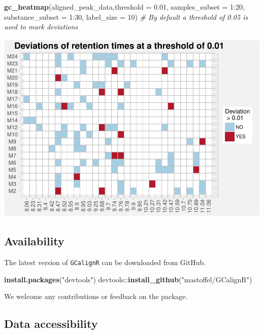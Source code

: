 \documentclass[]{article}
\newenvironment{Shaded}{}{}
\newcommand{\KeywordTok}[1]{\textbf{{#1}}}
\newcommand{\DataTypeTok}[1]{\textcolor[rgb]{0.50,0.00,0.00}{{#1}}}
\newcommand{\DecValTok}[1]{\textcolor[rgb]{0.00,0.00,1.00}{{#1}}}
\newcommand{\FloatTok}[1]{\textcolor[rgb]{0.50,0.00,0.50}{{#1}}}
\newcommand{\StringTok}[1]{\textcolor[rgb]{0.87,0.00,0.00}{{#1}}}
\newcommand{\CommentTok}[1]{\textcolor[rgb]{0.50,0.50,0.50}{\textit{{#1}}}}
\newcommand{\NormalTok}[1]{{#1}}
\begin{document}
\begin{Shaded}
\begin{Highlighting}[]
\KeywordTok{gc_heatmap}\NormalTok{(aligned_peak_data,}\DataTypeTok{threshold =} \FloatTok{0.01}\NormalTok{, }\DataTypeTok{samples_subset =} \DecValTok{1}\NormalTok{:}\DecValTok{20}\NormalTok{, }\DataTypeTok{substance_subset =} \DecValTok{1}\NormalTok{:}\DecValTok{30}\NormalTok{, }\DataTypeTok{label_size =} \DecValTok{10}\NormalTok{) }\CommentTok{# By default a threshold of 0.05 is used to mark deviations}
\end{Highlighting}
\end{Shaded}

\includegraphics{GCalignR_paper_files/figure-latex/unnamed-chunk-8-1.pdf}

\subsection{Availability}\label{availability}

The latest version of \texttt{GCalignR} can be downloaded from GitHub.

\begin{Shaded}
\begin{Highlighting}[]
\KeywordTok{install.packages}\NormalTok{(}\StringTok{"devtools"}\NormalTok{)}
\NormalTok{devtools::}\KeywordTok{install_github}\NormalTok{(}\StringTok{"mastoffel/GCalignR"}\NormalTok{)}
\end{Highlighting}
\end{Shaded}

We welcome any contributions or feedback on the package.

\subsection{Data accessibility}\label{data-accessibility}
\end{document}
